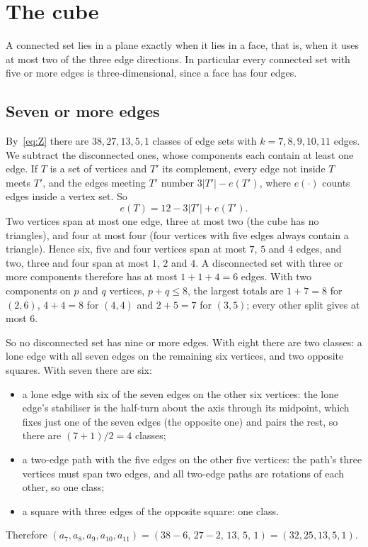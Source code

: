\documentclass[11pt]{amsart}
\theoremstyle{remark}
\begin{document}
\section{The cube}

A connected set lies in a plane exactly when it lies in a face, that is, when it uses at most two of the three edge directions. In particular every connected set with five or more edges is three-dimensional, since a face has four edges.

\subsection{Seven or more edges}

By~\eqref{eq:Z} there are $38,27,13,5,1$ classes of edge sets with $k=7,8,9,10,11$ edges. We subtract the disconnected ones, whose components each contain at least one edge. If $T$ is a set of vertices and $T'$ its complement, every edge not inside $T$ meets $T'$, and the edges meeting $T'$ number $3|T'|-e(T')$, where $e(\cdot)$ counts edges inside a vertex set. So
\[
e(T)=12-3|T'|+e(T').
\]
Two vertices span at most one edge, three at most two (the cube has no triangles), and four at most four (four vertices with five edges always contain a triangle). Hence six, five and four vertices span at most $7$, $5$ and $4$ edges, and two, three and four span at most $1$, $2$ and $4$. A disconnected set with three or more components therefore has at most $1+1+4=6$ edges. With two components on $p$ and $q$ vertices, $p+q\le8$, the largest totals are $1+7=8$ for $(2,6)$, $4+4=8$ for $(4,4)$ and $2+5=7$ for $(3,5)$; every other split gives at most $6$.

So no disconnected set has nine or more edges. With eight there are two classes: a lone edge with all seven edges on the remaining six vertices, and two opposite squares. With seven there are six:
\begin{itemize}
\item a lone edge with six of the seven edges on the other six vertices: the lone edge's stabiliser is the half-turn about the axis through its midpoint, which fixes just one of the seven edges (the opposite one) and pairs the rest, so there are $(7+1)/2=4$ classes;
\item a two-edge path with the five edges on the other five vertices: the path's three vertices must span two edges, and all two-edge paths are rotations of each other, so one class;
\item a square with three edges of the opposite square: one class.
\end{itemize}
Therefore $(a_7,a_8,a_9,a_{10},a_{11})=(38-6,\,27-2,\,13,\,5,\,1)=(32,25,13,5,1)$.
\end{document}
